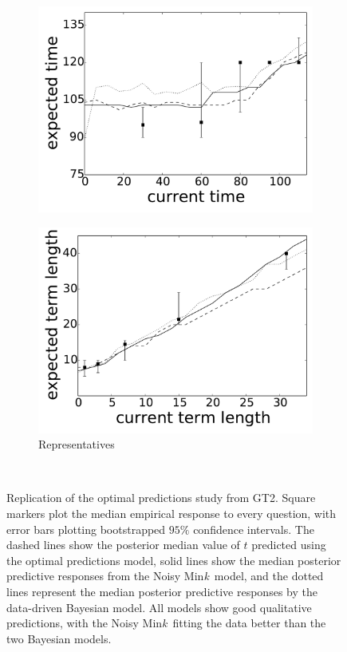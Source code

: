 \documentclass[doc,floatsintext]{apa6}
\newcommand{\mink}{{Min\textit{k}\ }}
\begin{document}
\begin{figure}
{\begin{subfigure}{.33\textwidth}
		\includegraphics[width=1.0\textwidth]{predictions_figures/movie_runtimes_pred.pdf}
	\end{subfigure}
	\begin{subfigure}{.33\textwidth}
		\caption{Representatives}
		\includegraphics[width=1.0\textwidth]{predictions_figures/representatives_terms_pred.pdf}
	\end{subfigure}
	}\\

	\caption{Replication of the optimal predictions study from GT2. Square markers plot the median empirical response to every question, with error bars plotting bootstrapped $95\%$ confidence intervals. The dashed lines show the posterior median value of $t$ predicted using the optimal predictions model, solid lines show the median posterior predictive responses from the Noisy \mink model, and the dotted lines represent the median posterior predictive responses by the data-driven Bayesian model. All models show good qualitative predictions, with the Noisy \mink fitting the data better than the two Bayesian models.}
	\label{fig:emp_vs_mink_agg_predictive}
\end{figure}
\end{document}
